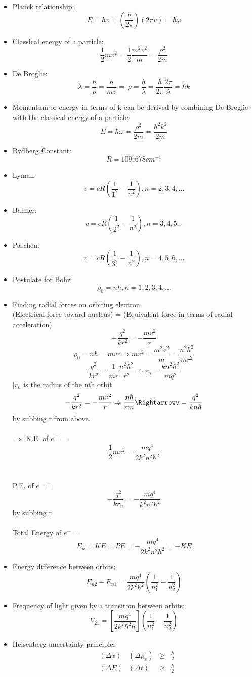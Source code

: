 \documentclass{article}
\begin{document}
\begin{itemize}
\item Planck relationship: $$ E=hv = (\frac{h}{2 \pi})(2 \pi v) = \hbar \omega$$
\item Classical energy of a particle: $$\frac{1}{2}mv^2 = \frac{1}{2}\frac{m^2v^2}{m}=\frac{\rho^2}{2m}$$
\item De Broglie: $$\lambda = \frac{h}{\rho} = \frac{h}{mv}\Rightarrow\rho=\frac{h}{\lambda}=\frac{h}{2\pi}\frac{2\pi}{\lambda}=\hbar k$$
\item Momentum or energy in terms of k can be derived by combining De Broglie with the classical energy of a particle:$$E=\hbar\omega=\frac{\rho^2}{2m}=\frac{\hbar^2 k^2}{2m}$$
\item Rydberg Constant: $$R=109,678cm^{-1}$$
\item Lyman: $$v=cR(\frac{1}{1^2}-\frac{1}{n^2}), n=2,3,4,...$$
\item Balmer: $$v=cR(\frac{1}{2^2}-\frac{1}{n^2}),n=3,4,5...$$
\item Paschen: $$v=cR(\frac{1}{3^2}-\frac{1}{n^2}),n=4,5,6,...$$
\item Postulate for Bohr:$$\rho_0=n\hbar,n=1,2,3,4,...$$
\item Finding radial forces on orbiting electron:\\(Electrical force toward nucleus) = (Equivalent force in terms of radial acceleration)\\$$-\frac{q^2}{kr^2}=-\frac{mv^2}{r}$$
  $$\rho_0=n\hbar=mvr  \Rightarrow mv^2=\frac{m^2v^2}{m}=\frac{n^2\hbar^2}{mr^2}$$ $$\frac{q^2}{kr^2}=\frac{1}{mr}\frac{n^2\hbar^2}{r^2}\Rightarrow r_n=\frac{kn^2\hbar^2}{mq^2}$$ $|r_n$ is the radius of the nth orbit
  $$-\frac{q^2}{kr^2}=-\frac{mv^2}{r}\Rightarrow \frac{n\hbar}{rm}\Rightarrowv=\frac{q^2}{kn\hbar}$$by subbing r from above.  \\\\$\Rightarrow$ K.E. of $e^-=$$$\frac{1}{2}mv^2=\frac{mq^4}{2k^2n^2\hbar^2}$$\\\\P.E. of $e^-=$$$-\frac{q^2}{kr_n}=-\frac{mq^4}{k^2n^2\hbar^2}$$ by subbing r\\\\Total Energy of $e^-=$$$E_n=KE=PE=-\frac{mq^4}{2k^2n^2\hbar^2}=-KE$$
\item Energy difference between orbits: $$E_{n2}-E_{n1}=\frac{mq^4}{2k^2\hbar^2}(\frac{1}{n_1^2}-\frac{1}{n_2^2})$$
\item Frequency of light given by a transition between orbits:$$V_{21}=\left[\frac{mq^4}{2k^2\hbar^2h}\right](\frac{1}{n_1^2}-\frac{1}{n_2^2})$$
\item Heisenberg uncertainty principle:\\
  \begin{align}
    \label{Heisenberg}
    &(\Delta x)&(\Delta \rho_x)& \ge&\frac{\hbar}{2}\\
    \label{Heisenberg part 2}
    &(\Delta E)&(\Delta t)&\ge&\frac{\hbar}{2}
  \end{align}
\end{itemize}
\end{document}
